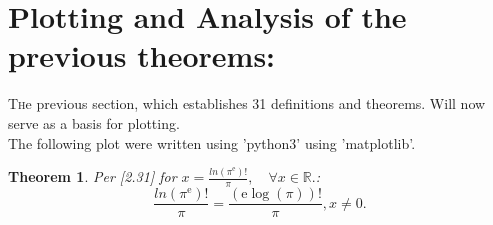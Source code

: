 \documentclass[10pt]{article}
\theoremstyle{plain}
\newtheorem{theorem}{Theorem}[section]
\theoremstyle{definition}
\theoremstyle{remark}
\begin{document}
\section{Plotting and Analysis of the previous theorems:}
\lettrine[lines=2, lhang=0.1, loversize=0.2]{T}he previous section, which establishes 31 definitions and theorems. Will now serve as a basis for plotting.\\
The following plot were written using 'python3' using 'matplotlib'.

\begin{theorem}
	Per [2.31] for $x = \frac{ln(\pi^\mathrm{e})!}{\pi}, \quad \forall x \in \mathbb{R}.$:
	\begin{equation}
		\frac{ln(\pi^\mathrm{e})!}{\pi} = \frac{(\mathrm{e} \log(\pi))!}{\pi}, x \neq 0.
	\end{equation}
\end{theorem}

\nocite{*}



\end{document}
